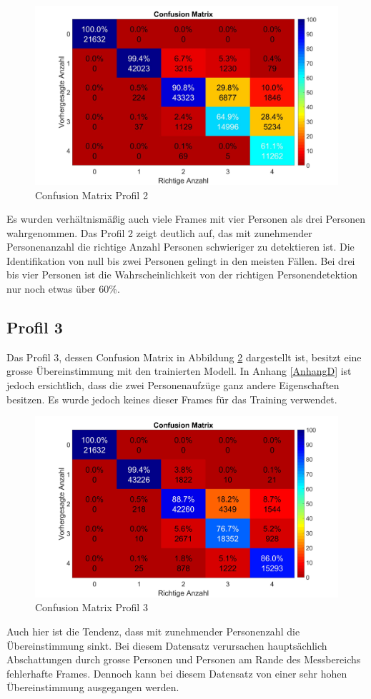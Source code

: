 \begin{figure}[H]
	\centering
	\includegraphics[width=0.55\linewidth]{fig/Profil_2m}
	\caption[Confusion Matrix Profil 2]{Confusion Matrix Profil 2}
			\label{fig:profil2}
\end{figure}
 Es wurden verhältnismäßig auch viele Frames mit vier Personen als drei Personen wahrgenommen. Das Profil 2 zeigt deutlich auf, das mit zunehmender Personenanzahl die richtige Anzahl Personen schwieriger zu detektieren ist. Die Identifikation von null bis zwei Personen gelingt in den meisten Fällen. Bei drei bis vier Personen ist die Wahrscheinlichkeit von der richtigen Personendetektion nur noch etwas über 60\%.

\subsection{Profil 3}
\label{subsec:Profil3}
Das Profil 3, dessen Confusion Matrix in Abbildung \ref{fig:profil3} dargestellt ist, besitzt eine grosse Übereinstimmung mit den trainierten Modell. In Anhang \ref{AnhangD} ist jedoch ersichtlich, dass die zwei Personenaufzüge ganz andere Eigenschaften besitzen. Es wurde jedoch keines dieser Frames für das Training verwendet.

\begin{figure}[H]
	\centering
	\includegraphics[width=0.55\linewidth]{fig/Profil_3m}
	\caption[Confusion Matrix Profil 3]{Confusion Matrix Profil 3}
		\label{fig:profil3}
\end{figure}

Auch hier ist die Tendenz, dass mit zunehmender Personenzahl die Übereinstimmung sinkt. Bei diesem Datensatz verursachen hauptsächlich Abschattungen durch grosse Personen und Personen am Rande des Messbereichs fehlerhafte Frames. Dennoch kann bei diesem Datensatz von einer sehr hohen Übereinstimmung  ausgegangen werden.

